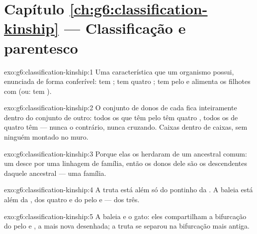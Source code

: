 \section*{Capítulo \ref{ch:g6:classification-kinship} --- Classificação e parentesco}

\begin{solution}{exo:g6:classification-kinship:1}
Uma característica que um organismo possui, enunciada de forma
conferível: tem ; tem quatro ; tem pelo e
alimenta os filhotes com  (ou: tem ).
\end{solution}

\begin{solution}{exo:g6:classification-kinship:2}
O conjunto de donos de cada  fica inteiramente dentro do
conjunto de outro: todos os que têm pelo têm quatro , todos os
 de quatro  têm  --- nunca o contrário,
nunca cruzando. Caixas dentro de caixas, sem ninguém montado no muro.
\end{solution}

\begin{solution}{exo:g6:classification-kinship:3}
Porque elas os herdaram de um ancestral comum: um  desce por
uma linhagem de família, então os donos dele são os descendentes
daquele ancestral --- uma família.
\end{solution}

\begin{solution}{exo:g6:classification-kinship:4}
A truta está além só do pontinho da . A baleia está
além da , dos quatro  e do pelo e  --- dos
três.
\end{solution}

\begin{solution}{exo:g6:classification-kinship:5}
A baleia e o gato: eles compartilham a bifurcação do pelo e , a
mais nova desenhada; a truta se separou na bifurcação mais antiga.
\end{solution}

